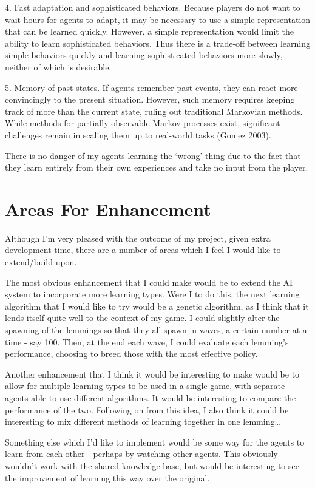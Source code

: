 \documentclass[a4paper,oneside]{report}
\begin{document}
4. Fast adaptation and sophisticated behaviors. Because players do not want to wait hours for agents to adapt, it may be necessary to use a simple representation that can be learned quickly. However, a simple representation would limit the ability to learn sophisticated behaviors. Thus there is a trade-off between learning simple behaviors quickly and learning sophisticated behaviors more slowly, neither of which is desirable.

5. Memory of past states. If agents remember past events, they can react more convincingly to the present situation. However, such memory requires keeping track of more than the current state, ruling out traditional Markovian methods. While methods for partially observable Markov processes exist, significant challenges remain in scaling them up to real-world tasks (Gomez 2003).

There is no danger of my agents learning the `wrong' thing due to the fact that they learn entirely from their own experiences and take no input from the player.

\section{Areas For Enhancement}

Although I'm very pleased with the outcome of my project, given extra development time, there are a number of areas which I feel I would like to extend/build upon.

The most obvious enhancement that I could make would be to extend the AI system to incorporate more learning types. Were I to do this, the next learning algorithm that I would like to try would be a genetic algorithm, as I think that it lends itself quite well to the context of my game. I could slightly alter the spawning of the lemmings so that they all spawn in waves, a certain number at a time - say 100. Then, at the end each wave, I could evaluate each lemming's performance, choosing to breed those with the most effective policy.

Another enhancement that I think it would be interesting to make would be to allow for multiple learning types to be used in a single game, with separate agents able to use different algorithms. It would be interesting to compare the performance of the two. Following on from this idea, I also think it could be interesting to mix different methods of learning together in one lemming…

Something else which I'd like to implement would be some way for the agents to learn from each other - perhaps by watching other agents. This obviously wouldn't work with the shared knowledge base, but would be interesting to see the improvement of learning this way over the original.
\end{document}

